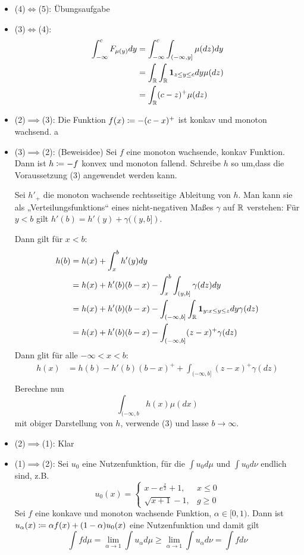 \documentclass[a4paper,twoside,DIV15,BCOR12mm]{scrbook}
\begin{document}
\begin{beweis}
\begin{itemize}
\item (4)$\iff$(5): Übungsaufgabe
\item (3)$\iff$(4):
\begin{align*}
\int_{-\infty}^c F_{\mu(y)}dy &= \int_{-\infty}^c \int_{(-\infty,y]} \mu(dz)dy \\
&=\int_{\mathbb{R}} \int_{\mathbb{R}} \mathbf 1_{z\le y\le c}dy \mu(dz) \\
&=\int_{\mathbb{R}} (c-z)^+ \mu(dz)
\end{align*}
\item (2)$\implies$(3): Die Funktion $f(x) \da -(c-x)^+$ ist konkav und monoton wachsend.
a\item (3)$\implies$(2): (Beweisidee) Sei $f$ eine monoton wachsende, konkav Funktion. Dann ist $h\da -f$ konvex und monoton fallend. Schreibe $h$ so um,dass die Voraussetzung (3) angewendet werden kann.

Sei $h'_+$ die monoton wachsende rechtsseitige Ableitung von $h$. Man kann sie als „Verteilungsfunktions“ eines nicht-negativen Maßes $\gamma$ auf $\mathbb{R}$ verstehen: Für $y<b$ gilt $h'(b) = h'(y) + \gamma( (y,b])$.

Dann gilt für $x<b$:
\begin{align*}
h(b) &= h(x) + \int_x^b h'(y) dy \\
&=h(x) + h'(b)(b-x) -\int_x^b \int_{(y,b]} \gamma(dz)dy \\
&=h(x) + h'(b)(b-x) - \int_{(-\infty,b]}\int_{\mathbb{R}} \mathbf 1_{y:x\le y \le z} dy \gamma(dz) \\
&=h(x) + h'(b)(b-x) - \int_{(-\infty,b]} (z-x)^+ \gamma(dz) 
\end{align*}
Dann glit für alle $-\infty<x<b$:
\begin{align*}
h(x) &= h(b) - h'(b)(b-x)^+ + \int_{(-\infty,b]} (z-x)^+ \gamma(dz) \\
\end{align*}
Berechne nun
\[
\int_{(-\infty,b} h(x) \mu(dx)
\]
 mit obiger Darstellung von $h$, verwende (3) und lasse $b\to\infty$.
\item (2)$\implies$(1): Klar
\item (1)$\implies$(2): Sei $u_0$ eine Nutzenfunktion, für die $\int u_0d\mu$ und $\int u_0d\nu$ endlich sind, z.B.
\[
u_0(x) = 
\begin{cases}
x - e^{\frac x2} + 1, & x\le 0\\
\sqrt{x + 1} -1, &g\ge 0
\end{cases}
\]
Sei $f$ eine konkave und monoton wachsende Funktion, $\alpha \in [0,1)$. Dann ist $u_\alpha(x) \da \alpha f(x) + (1-\alpha)u_0(x)$ eine Nutzenfunktion und damit gilt 
\[
\int f d\mu = \lim_{\alpha\to 1} \int u_\alpha d\mu \ge \lim_{\alpha \to 1} \int u_{\alpha}d\nu = \int f d\nu
\]
\end{itemize}
\end{beweis}
\end{document}
